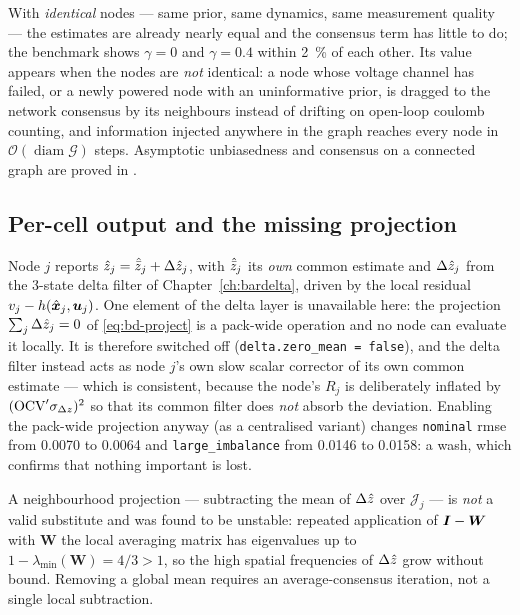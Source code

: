 \begin{remark}\label{rem:con-purpose}
With \emph{identical} nodes --- same prior, same dynamics, same measurement quality --- the
estimates are already nearly equal and the consensus term has little to do; the benchmark shows
$\gamma=0$ and $\gamma=\num{0.4}$ within \SI{2}{\percent} of each other. Its value appears when
the nodes are \emph{not} identical: a node whose voltage channel has failed, or a newly powered
node with an uninformative prior, is dragged to the network consensus by its neighbours instead
of drifting on open-loop coulomb counting, and information injected anywhere in the graph reaches
every node in $\mathcal{O}(\operatorname{diam}\mathcal{G})$ steps. Asymptotic unbiasedness and
consensus on a connected graph are proved in \cite{olfatisaber2009kcf}.
\end{remark}

\subsection{Per-cell output and the missing projection}
Node $j$ reports $\hat{z}_j = \hat{\bar{z}}_j + \Delta\hat{z}_j$, with $\hat{\bar{z}}_j$ its
\emph{own} common estimate and $\Delta\hat{z}_j$ from the 3-state delta filter of
Chapter~\ref{ch:bardelta}, driven by the local residual $v_j - h(\hat{\bm{x}}_j,\bm{u}_j)$. One element
of the delta layer is unavailable here: the projection $\sum_j\Delta\hat{z}_j = 0$ of
\eqref{eq:bd-project} is a pack-wide operation and no node can evaluate it locally. It is
therefore switched off (\texttt{delta.zero\_mean = false}), and the delta filter instead acts as
node $j$'s own slow scalar corrector of its own common estimate --- which is consistent, because
the node's $R_j$ is deliberately inflated by $(\mathrm{OCV}'\sigma_{\Delta z})^2$ so that its common
filter does \emph{not} absorb the deviation. Enabling the pack-wide projection anyway (as a
centralised variant) changes \texttt{nominal} rmse from \num{0.0070} to \num{0.0064} and
\texttt{large\_imbalance} from \num{0.0146} to \num{0.0158}: a wash, which confirms that nothing
important is lost.

A neighbourhood projection --- subtracting the mean of $\Delta\hat{z}$ over $\mathcal{J}_j$ --- is
\emph{not} a valid substitute and was found to be unstable: repeated application of
$\bm{I}-\bm{W}$ with $\bm{W}$ the local averaging matrix has eigenvalues up to $1-\lambda_{\min}(\bm{W})=4/3>1$,
so the high spatial frequencies of $\Delta\hat{z}$ grow without bound. Removing a global mean
requires an average-consensus iteration, not a single local subtraction.

